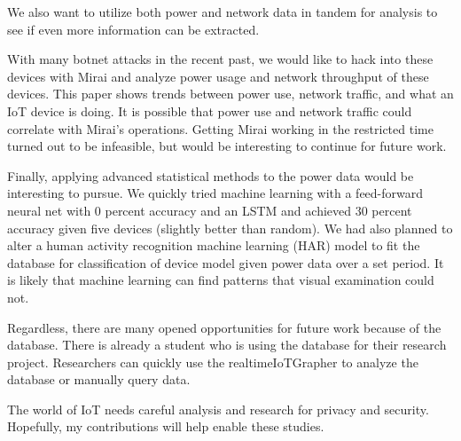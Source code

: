 We also want to utilize both power and network data in tandem for analysis to see if even more information can be extracted.

With many botnet attacks in the recent past, we would like to hack into these devices with Mirai and analyze power usage and network throughput of these devices. This paper shows trends between power use, network traffic, and what an IoT device is doing. It is possible that power use and network traffic could correlate with Mirai's operations. Getting Mirai working in the restricted time turned out to be infeasible, but would be interesting to continue for future work.

Finally, applying advanced statistical methods to the power data would be interesting to pursue. We quickly tried machine learning with a feed-forward neural net with 0 percent accuracy and an LSTM and achieved 30 percent accuracy given five devices (slightly better than random). We had also planned to alter a human activity recognition machine learning (HAR) model to fit the database for classification of device model given power data over a set period. It is likely that machine learning can find patterns that visual examination could not.

Regardless, there are many opened opportunities for future work because of the database. There is already a student who is using the database for their research project. Researchers can quickly use the realtimeIoTGrapher to analyze the database or manually query data.

The world of IoT needs careful analysis and research for privacy and security. Hopefully, my contributions will help enable these studies.